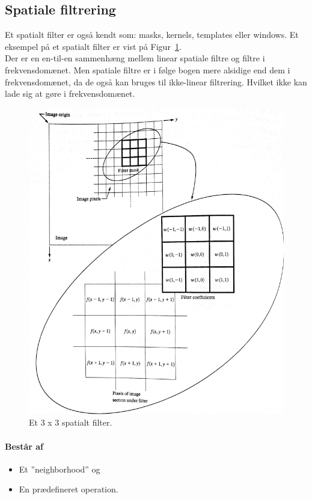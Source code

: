 \subsection{Spatiale filtrering}
Et spatialt filter er også kendt som: masks, kernels, templates eller windows. Et eksempel på et spatialt filter er vist på Figur~\ref{fig:spatial-filter}.\\

Der er en en-til-en sammenhæng mellem linear spatiale filtre og filtre i frekvensdomænet. Men spatiale filtre er i følge bogen mere alsidige end dem i frekvensdomænet, da de også kan bruges til ikke-linear filtrering. Hvilket ikke kan lade sig at gøre i frekvensdomænet.

\begin{figure}[H]
	\centering
	\includegraphics[width=0.8\linewidth]{figs/spm02/spatial-filter}
	\caption{Et 3 x 3 spatialt filter.}
	\label{fig:spatial-filter}
\end{figure}

\paragraph{Består af}

\begin{itemize}
	\item Et ''neighborhood'' og 
	\item En prædefineret operation.
\end{itemize}

